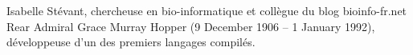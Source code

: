 \documentclass[PhD,english,french,nonatbib]{ulthese} %
\begin{document}
\frontmatter                    %

\pagestitre                     %

\cleardoublepage

\setcounter{tocdepth}{2}
\tableofcontents                %
\cleardoublepage

\listoftables                   %
\cleardoublepage

\listoffigures                  %
\cleardoublepage


\cleardoublepage



\hfill \vspace{4cm}

\begin{epigraphs}\setlength{\itemsep}{4cm}
%
      {Isabelle Stévant, chercheuse en bio-informatique et collègue du blog bioinfo-fr.net}
%
      {Rear Admiral Grace Murray Hopper (9 December 1906 – 1 January 1992), développeuse d'un des premiers langages compilés.}
\end{epigraphs}


\cleardoublepage


\mainmatter                                     %

\end{document}
